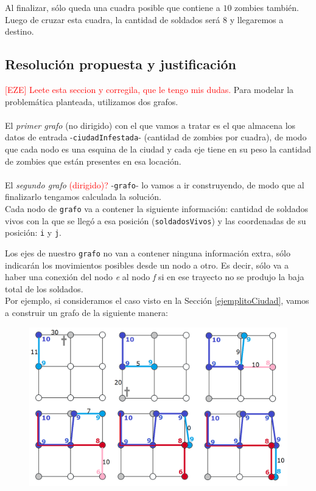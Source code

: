 Al finalizar, s\'olo queda una cuadra posible que contiene a $10$ zombies tambi\'en. Luego de cruzar esta cuadra, la cantidad de soldados ser\'a $8$ y llegaremos a destino.



\newpage
\subsection{Resoluci\'on propuesta y justificaci\'on}

\textcolor{red}{[EZE] Leete esta seccion y corregila, que le tengo mis dudas. }Para modelar la problem\'atica planteada, utilizamos dos grafos.\\
\\

El \emph{primer grafo} (no dirigido) con el que vamos a tratar es el que almacena los datos de entrada -\texttt{ciudadInfestada}- (cantidad de zombies por cuadra), de modo que cada nodo es una esquina de la ciudad y cada eje tiene en su peso la cantidad de zombies que est\'an presentes en esa locaci\'on.\\
\\

El \emph{segundo grafo} \textcolor{red}{(dirigido)?} -\texttt{grafo}- lo vamos a ir construyendo, de modo que al finalizarlo tengamos calculada la soluci\'on.\\

Cada nodo de \texttt{grafo} va a contener la siguiente informaci\'on: cantidad de soldados vivos con la que se lleg\'o a esa posici\'on (\texttt{soldadosVivos}) y las coordenadas de su posici\'on: \texttt{i} y \texttt{j}.

Los ejes de nuestro \texttt{grafo} no van a contener ninguna informaci\'on extra, s\'olo indicar\'an los movimientos posibles desde un nodo a otro. 
Es decir, s\'olo va a haber una conexi\'on del nodo \emph{e} al nodo \emph{f} si en ese trayecto no se produjo la baja total de los soldados.\\

Por ejemplo, si consideramos el caso visto en la Secci\'on \ref{ejemplitoCiudad}, vamos a construir un grafo de la siguiente manera:

  \begin{figure}[h!]
   \begin{center}
 	\includegraphics[scale=0.4]{imagenes/ej2/todos.png}
   \end{center}
 \end{figure}
 
